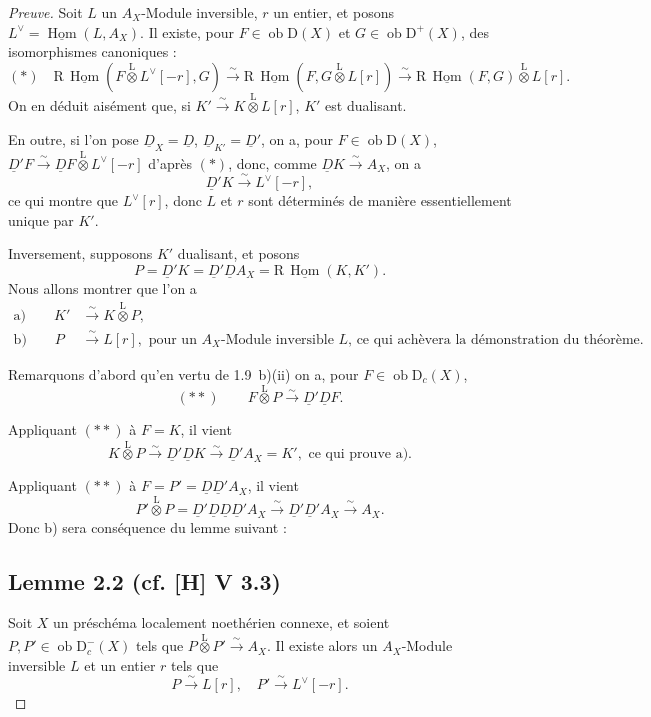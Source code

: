 \documentclass[11pt]{article}
\DeclareMathOperator{\Hom}{Hom}
\newcommand{\R}{\mathrm{R}}
\newcommand{\D}{\mathrm{D}}
\newcommand{\ob}{\operatorname{ob}}
\providecommand{\Hom}{\operatorname{Hom}}
\providecommand{\ob}{\operatorname{ob}}
\providecommand{\R}{\mathrm R}
\providecommand{\Hom}{\operatorname{Hom}}
\begin{document}
\begin{proof}[Preuve]
Soit $L$ un $A_X$-Module inversible, $r$ un entier, et posons $L^{\vee} = \underline{\Hom}(L, A_X)$. Il existe, pour $F \in \ob \D(X)$ et $G \in \ob \D^{+}(X)$, des isomorphismes canoniques :
\[
(*) \quad \R\,\underline{\Hom}(F \mathop{\otimes}\limits^{\mathrm{L}} L^{\vee}[-r], G) \xrightarrow{\sim} \R\,\underline{\Hom}(F, G \mathop{\otimes}\limits^{\mathrm{L}} L[r]) \xrightarrow{\sim} \R\,\underline{\Hom}(F,G) \mathop{\otimes}\limits^{\mathrm{L}} L[r].
\]
On en déduit aisément que, si $K' \xrightarrow{\sim} K \mathop{\otimes}\limits^{\mathrm{L}} L[r]$, $K'$ est dualisant.

En outre, si l'on pose $\underline{D}_X = \underline{D}$, $\underline{D}_{K'} = \underline{D}'$, on a, pour $F \in \ob \D(X)$, $\underline{D}'F \xrightarrow{\sim} \underline{D} F \mathop{\otimes}\limits^{\mathrm{L}} L^{\vee}[-r]$ d'après $(*)$, donc, comme $\underline{D} K \xrightarrow{\sim} A_X$, on a
\[
\underline{D}' K \xrightarrow{\sim} L^{\vee}[-r],
\]
ce qui montre que $L^{\vee}[r]$, donc $L$ et $r$ sont déterminés de manière essentiellement unique par $K'$.

Inversement, supposons $K'$ dualisant, et posons
\[
P = \underline{D}'K = \underline{D}'\underline{D} A_X = \R\,\underline{\Hom}(K,K').
\]
Nous allons montrer que l'on a
\begin{align*}
\text{a)} \qquad K' &\xrightarrow{\sim} K \mathop{\otimes}\limits^{\mathrm{L}} P, \\
\text{b)} \qquad P &\xrightarrow{\sim} L[r], \text{ pour un $A_X$-Module inversible $L$, ce qui achèvera la démonstration du théorème.}
\end{align*}

Remarquons d'abord qu'en vertu de 1.9~b)(ii) on a, pour $F \in \ob \D_c(X)$,
\[
(**) \qquad F \mathop{\otimes}\limits^{\mathrm{L}} P \xrightarrow{\sim} \underline{D}'\underline{D} F.
\]

Appliquant $(**)$ à $F = K$, il vient
\[
K \mathop{\otimes}\limits^{\mathrm{L}} P \xrightarrow{\sim} \underline{D}'\underline{D} K \xrightarrow{\sim} \underline{D}' A_X = K', \text{ ce qui prouve a).}
\]

Appliquant $(**)$ à $F = P' = \underline{D}\underline{D}'A_X$, il vient
\[
P' \mathop{\otimes}\limits^{\mathrm{L}} P = \underline{D}'\underline{D}\underline{D}\underline{D}'A_X \xrightarrow{\sim} \underline{D}'\underline{D}'A_X \xrightarrow{\sim} A_X.
\]
Donc b) sera conséquence du lemme suivant :

\subsection*{Lemme 2.2 (cf. [H] V 3.3)}
Soit $X$ un préschéma localement noethérien connexe, et soient $P, P' \in \ob \D_c^{-}(X)$ tels que $P \mathop{\otimes}\limits^{\mathrm{L}} P' \xrightarrow{\sim} A_X$. Il existe alors un $A_X$-Module inversible $L$ et un entier $r$ tels que
\[
P \xrightarrow{\sim} L[r], \quad P' \xrightarrow{\sim} L^{\vee}[-r].
\]


\end{proof}
\end{document}
